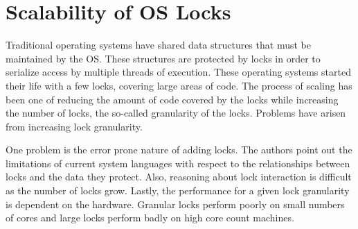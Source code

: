 \documentclass[12pt]{article}
\begin{document}
\section*{Scalability of OS Locks}
Traditional operating systems have shared data structures that must be
maintained by the OS.  These structures are protected by locks in
order to serialize access by multiple threads of execution.  These
operating systems started their life with a few locks, covering large
areas of code.  The process of scaling has been one of reducing the
amount of code covered by the locks while increasing the number of
locks, the so-called granularity of the locks.  Problems have
arisen from increasing lock granularity.

One problem is the error prone nature of adding locks.  The authors
point out the limitations of current system languages with respect to
the relationships between locks and the data they protect.  Also,
reasoning about lock interaction is difficult as the number of locks
grow.  Lastly, the performance for a given lock granularity is
dependent on the hardware.  Granular locks perform poorly on small
numbers of cores and large locks perform badly on high core count
machines.



{}

\end{document}
